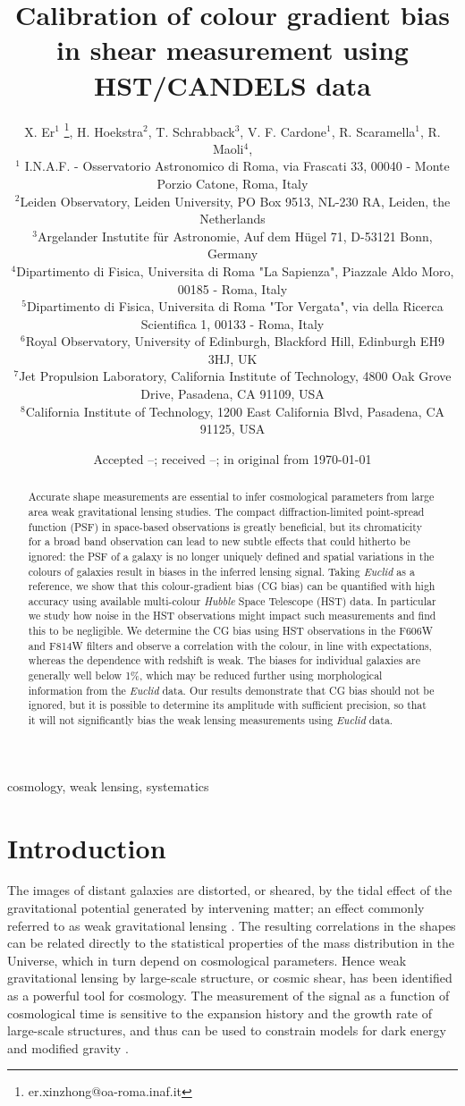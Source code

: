 \documentclass[useAMS,usenatbib]{mnras}
\title[Colour gradient bias]
{Calibration of colour gradient bias in shear measurement using HST/CANDELS data}
\author[X. Er et al.]%
{
X. Er$^1$ \thanks{er.xinzhong@oa-roma.inaf.it},
H. Hoekstra$^2$, T. Schrabback$^3$, V. F. Cardone$^1$, R. Scaramella$^1$, R. Maoli$^4$,
\newauthor{M. Vicinanza$^{1,4,5}$, B. Gillis$^{6}$, J. Rhodes$^{7,8}$}
\\
$^1$ I.N.A.F. - Osservatorio Astronomico di Roma, via Frascati 33, 00040 - Monte Porzio Catone, Roma, Italy\\
$^2$Leiden Observatory, Leiden University, PO Box 9513, NL-230 RA, Leiden, the Netherlands \\
$^3$Argelander Instutite f\"ur Astronomie, Auf dem H\"ugel 71, D-53121 Bonn, Germany\\
$^4$Dipartimento di Fisica, Universita di Roma "La Sapienza", Piazzale Aldo Moro, 00185 - Roma, Italy\\
$^5$Dipartimento di Fisica, Universita di Roma "Tor Vergata", via della Ricerca Scientifica 1, 00133 - Roma, Italy\\
$^6$Royal Observatory, University of Edinburgh, Blackford Hill, Edinburgh EH9 3HJ, UK\\
$^7$Jet Propulsion Laboratory, California Institute of Technology, 4800 Oak Grove Drive, Pasadena, CA 91109, USA\\
$^8$California Institute of Technology, 1200 East California Blvd, Pasadena, CA 91125, USA
}
\date{Accepted --;  received --;  in original from \today}
\begin{document}
\maketitle

\begin{abstract}
Accurate shape measurements are essential to infer cosmological parameters from large area weak gravitational lensing studies. The compact diffraction-limited point-spread function (PSF) in space-based observations is greatly beneficial, but its chromaticity for a broad band observation can lead to new subtle effects that could hitherto be ignored: the PSF of a galaxy is no longer uniquely defined  and spatial variations in the colours of galaxies result in biases in the inferred lensing signal. Taking {\it Euclid} as a reference, we show that this colour-gradient bias (CG bias) can be quantified with high accuracy using available multi-colour {\it Hubble} Space Telescope (HST) data. In particular we study how noise in the HST observations might impact such measurements and find this to be negligible. We determine the CG bias using HST observations in the F606W and F814W filters and observe a correlation with the colour, in line with expectations, whereas the dependence with redshift is weak. The biases for individual galaxies are generally well below 1\%, which may be reduced further using morphological information from the {\it Euclid} data. Our results demonstrate that CG bias should not be ignored, but it is possible to determine its amplitude with sufficient precision, so that it will not significantly bias the weak lensing measurements using {\it Euclid} data.
\end{abstract}
\begin{keywords} cosmology, weak lensing, systematics
\end{keywords}


\section{Introduction}

The images of distant galaxies are distorted, or sheared, by the tidal effect of the gravitational  potential generated by intervening matter; an effect commonly referred to as weak gravitational lensing \citep[see e.g.][for a detailed introduction]{Bartelmann01}. The resulting correlations in the shapes can be related directly to the statistical properties of the mass distribution in the Universe, which in turn depend on cosmological parameters. Hence weak gravitational lensing by large-scale structure, or cosmic shear, has been identified as a powerful tool for cosmology. The measurement of the signal as a function of cosmological time is sensitive to the expansion history and the growth rate of large-scale structures, and thus can be used to constrain models for dark energy and modified gravity \citep{2016arXiv160600180A}.
\end{document}

